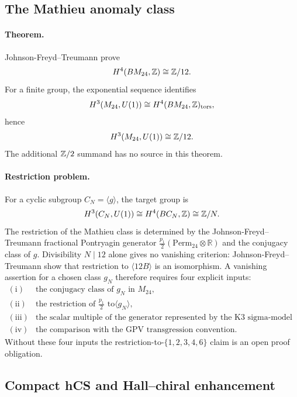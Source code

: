 \subsection*{The Mathieu anomaly class}
\label{subsec:conj1-mathieu-anomaly}

\paragraph{Theorem.}
Johnson-Freyd--Treumann prove
\[
        H^4(BM_{24},\mathbb{Z})\cong \mathbb{Z}/12 .
\]
For a finite group, the exponential sequence identifies
\[
        H^3(M_{24},U(1))\cong H^4(BM_{24},\mathbb{Z})_{\mathrm{tors}},
\]
hence
\[
        H^3(M_{24},U(1))\cong \mathbb{Z}/12 .
\]
The additional \(\mathbb{Z}/2\) summand has no source in this theorem.

\paragraph{Restriction problem.}
For a cyclic subgroup \(C_N=\langle g\rangle\), the target group is
\[
        H^3(C_N,U(1))\cong H^4(BC_N,\mathbb{Z})\cong \mathbb{Z}/N .
\]
The restriction of the Mathieu class is determined by the
Johnson-Freyd--Treumann fractional Pontryagin generator
\(\frac{p_1}{2}(\mathrm{Perm}_{24}\otimes\mathbb R)\) and the conjugacy
class of \(g\).  Divisibility \(N\mid 12\) alone gives no vanishing
criterion: Johnson-Freyd--Treumann show that restriction to
\(\langle 12B\rangle\) is an isomorphism.  A vanishing assertion for a
chosen class \(g_N\) therefore requires four explicit inputs:
\[
\begin{array}{ll}
\mathrm{(i)}&\text{the conjugacy class of \(g_N\) in \(M_{24}\),}\\
\mathrm{(ii)}&\text{the restriction of \(\frac{p_1}{2}\) to
\(\langle g_N\rangle\),}\\
\mathrm{(iii)}&\text{the scalar multiple of the generator represented by
the K3 sigma-model anomaly,}\\
\mathrm{(iv)}&\text{the comparison with the GPV transgression convention.}
\end{array}
\]
Without these four inputs the restriction-to-\(\{1,2,3,4,6\}\) claim is an
open proof obligation.

\subsection*{Compact hCS and Hall--chiral enhancement}
\label{subsec:conj1-compact-hcs}

